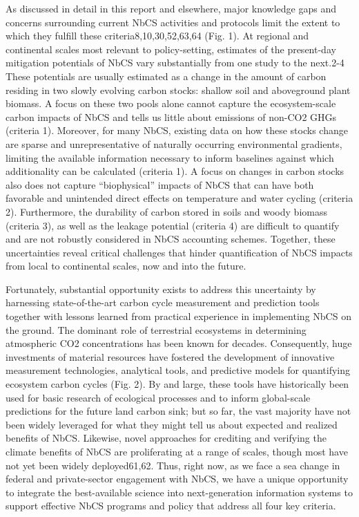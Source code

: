\documentclass[
  letterpaper,
  DIV=11,
  numbers=noendperiod]{scrreprt}
\begin{document}
As discussed in detail in this report and elsewhere, major knowledge
gaps and concerns surrounding current NbCS activities and protocols
limit the extent to which they fulfill these criteria8,10,30,52,63,64
(Fig. 1). At regional and continental scales most relevant to
policy-setting, estimates of the present-day mitigation potentials of
NbCS vary substantially from one study to the next.2-4 These potentials
are usually estimated as a change in the amount of carbon residing in
two slowly evolving carbon stocks: shallow soil and aboveground plant
biomass. A focus on these two pools alone cannot capture the
ecosystem-scale carbon impacts of NbCS and tells us little about
emissions of non-CO2 GHGs (criteria 1). Moreover, for many NbCS,
existing data on how these stocks change are sparse and unrepresentative
of naturally occurring environmental gradients, limiting the available
information necessary to inform baselines against which additionality
can be calculated (criteria 1). A focus on changes in carbon stocks also
does not capture ``biophysical'' impacts of NbCS that can have both
favorable and unintended direct effects on temperature and water cycling
(criteria 2). Furthermore, the durability of carbon stored in soils and
woody biomass (criteria 3), as well as the leakage potential (criteria
4) are difficult to quantify and are not robustly considered in NbCS
accounting schemes. Together, these uncertainties reveal critical
challenges that hinder quantification of NbCS impacts from local to
continental scales, now and into the future.

Fortunately, substantial opportunity exists to address this uncertainty
by harnessing state-of-the-art carbon cycle measurement and prediction
tools together with lessons learned from practical experience in
implementing NbCS on the ground. The dominant role of terrestrial
ecosystems in determining atmospheric CO2 concentrations has been known
for decades. Consequently, huge investments of material resources have
fostered the development of innovative measurement technologies,
analytical tools, and predictive models for quantifying ecosystem carbon
cycles (Fig. 2). By and large, these tools have historically been used
for basic research of ecological processes and to inform global-scale
predictions for the future land carbon sink; but so far, the vast
majority have not been widely leveraged for what they might tell us
about expected and realized benefits of NbCS. Likewise, novel approaches
for crediting and verifying the climate benefits of NbCS are
proliferating at a range of scales, though most have not yet been widely
deployed61,62. Thus, right now, as we face a sea change in federal and
private-sector engagement with NbCS, we have a unique opportunity to
integrate the best-available science into next-generation information
systems to support effective NbCS programs and policy that address all
four key criteria.
\end{document}
